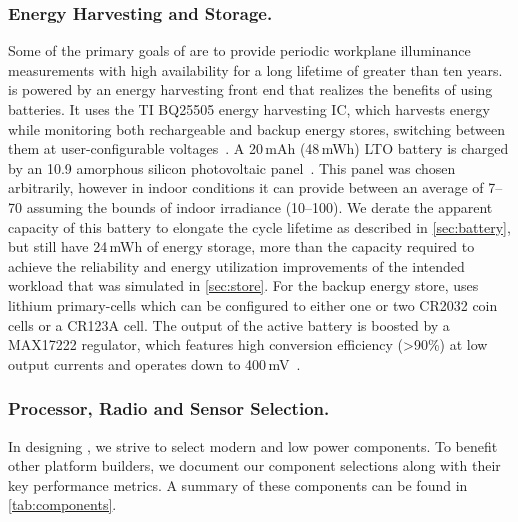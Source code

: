\subsubsection{Energy Harvesting and Storage.}
Some of the primary goals of \name are to provide periodic workplane illuminance measurements with high availability for a long lifetime of greater than ten years. 
\name is powered by an energy harvesting front end that realizes the benefits
of using batteries. It uses the TI BQ25505 energy harvesting IC, which
harvests energy while monitoring both
rechargeable and backup energy stores,
switching between them at user-configurable voltages~\cite{bq25505}. A
20\,mAh (48\,mWh) LTO battery is charged by an 10.9\ssi{\centi\meter\squared} amorphous
silicon photovoltaic panel~\cite{LTODatasheet, LTODatasheet2}. 
This panel was chosen arbitrarily, however in indoor conditions it can provide between an average of 7--70\ssi{\micro\watt} assuming the bounds of indoor irradiance (10--100\ssi[per-mode=symbol]{\micro\watt\per\centi\meter\squared}). 
We derate the apparent
capacity of this battery to 
elongate the cycle lifetime as described in \cref{sec:battery}, but still have 24\,mWh of
energy storage, more than the capacity required to achieve the reliability and energy utilization
improvements of the intended workload that was simulated in \cref{sec:store}. 
For the backup energy
store, \name uses lithium primary-cells which can be configured to either one or two CR2032 coin
cells or a CR123A cell.
The output of the active battery
is boosted by a MAX17222 regulator, which features high conversion efficiency
(>90\%) at low output currents and operates down to 400\,mV~\cite{max17222}.

\subsubsection{Processor, Radio and Sensor Selection.}
In designing \name, we strive to select modern and low power components.
To benefit other
platform builders, we document our component selections
along with their key performance metrics. A summary of these
components can be found in \cref{tab:components}.

